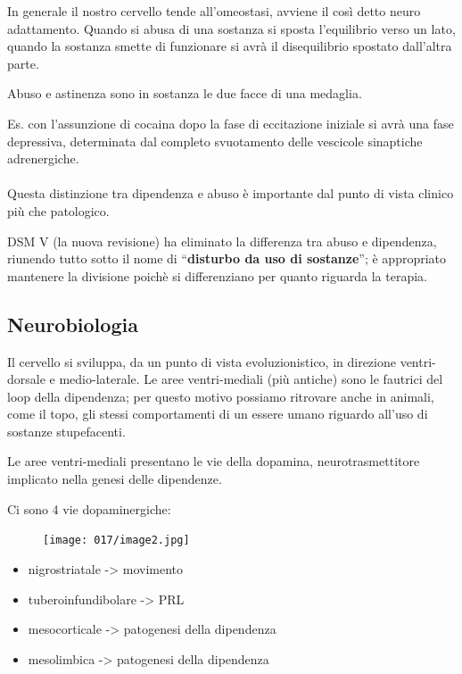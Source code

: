 In generale il nostro cervello tende all'omeostasi, avviene il così
detto neuro adattamento. Quando si abusa di una sostanza si sposta
l'equilibrio verso un lato, quando la sostanza smette di funzionare si
avrà il disequilibrio spostato dall'altra parte.

Abuso e astinenza sono in sostanza le due facce di una medaglia.

Es. con l'assunzione di cocaina dopo la fase di eccitazione iniziale si
avrà una fase depressiva, determinata dal completo svuotamento delle
vescicole sinaptiche adrenergiche.
\\\\
Questa distinzione tra dipendenza e abuso è importante dal punto di
vista clinico più che patologico.

DSM V (la nuova revisione) ha eliminato la differenza tra abuso e
dipendenza, riunendo tutto sotto il nome di ``\textbf{disturbo da uso di
sostanze}''; è appropriato mantenere la divisione poichè si
differenziano per quanto riguarda la terapia.

\subsection{Neurobiologia}

Il cervello si sviluppa, da un punto di vista evoluzionistico, in
direzione ventri-dorsale e medio-laterale. Le aree ventri-mediali (più
antiche) sono le fautrici del loop della dipendenza; per questo motivo
possiamo ritrovare anche in animali, come il topo, gli stessi
comportamenti di un essere umano riguardo all'uso di sostanze
stupefacenti.

Le aree ventri-mediali presentano le vie della dopamina,
neurotrasmettitore implicato nella genesi delle dipendenze.

Ci sono 4 vie dopaminergiche:

\begin{figure}[!ht]
\centering
	\texttt{[image: 017/image2.jpg]}
\end{figure}

\begin{itemize}
\item
  nigrostriatale -> movimento
\item
  tuberoinfundibolare -> PRL
\item
  mesocorticale -> patogenesi della dipendenza
\item
  mesolimbica -> patogenesi della dipendenza
\end{itemize}

